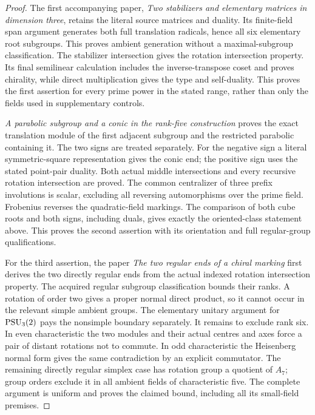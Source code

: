 \documentclass[11pt]{article}
\begin{document}
\begin{proof}
The first accompanying paper, \emph{Two stabilizers and elementary
matrices in dimension three}, retains the literal source matrices and
duality. Its finite-field span argument generates both full translation
radicals, hence all six elementary root subgroups. This proves ambient
generation without a maximal-subgroup classification. The stabilizer
intersection gives the rotation intersection property. Its final
semilinear calculation includes the inverse-transpose coset and proves
chirality, while direct multiplication gives the type and self-duality.
This proves the first assertion for every prime power in the stated
range, rather than only the fields used in supplementary controls.

\emph{A parabolic subgroup and a conic in the rank-five construction}
proves the exact translation module
of the first adjacent subgroup and the restricted parabolic containing
it. The two signs are treated separately. For the negative sign a
literal symmetric-square representation gives the conic end; the
positive sign uses the stated point-pair duality. Both actual middle
intersections and every recursive rotation intersection are proved.
The common centralizer of three prefix involutions is scalar, excluding
all reversing automorphisms over the prime field. Frobenius reverses
the quadratic-field markings. The comparison of both cube roots and
both signs, including duals, gives exactly the oriented-class statement
above. This proves the second assertion with its orientation and full
regular-group qualifications.

For the third assertion, the paper \emph{The two regular ends of a chiral marking}
first derives the two directly regular ends from the actual indexed
rotation intersection property. The acquired regular subgroup
classification bounds their ranks. A rotation of order two gives a
proper normal direct product, so it cannot occur in the relevant simple
ambient groups. The elementary unitary argument for $\operatorname{PSU}_3(2)$ pays
the nonsimple boundary separately. It remains to exclude rank six.
In even characteristic the two modules and their actual centres and
axes force a pair of distant rotations not to commute. In odd
characteristic the Heisenberg normal form gives the same contradiction
by an explicit commutator. The remaining directly regular simplex case
has rotation group a quotient of $A_7$; group orders exclude it in all
ambient fields of characteristic five. The complete argument is uniform
and proves the claimed bound, including all its small-field premises.
\end{proof}
\end{document}
